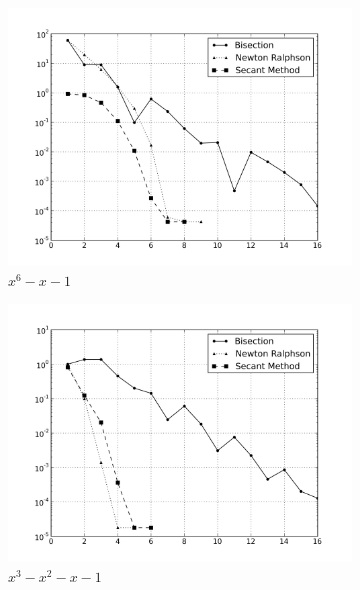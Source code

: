 \documentclass[12,a4paper]{article}
\begin{document}
    \begin{figure}[h!]
        \centering
        \begin{subfigure}[t]{0.49\textwidth}
            \includegraphics[width=\textwidth]{plots/root1.png}
            \caption{$x^6-x-1$}
            \label{fig:root1}
        \end{subfigure}
        \begin{subfigure}[t]{0.49\textwidth}
            \includegraphics[width=\textwidth]{plots/root2.png}
            \caption{$x^3-x^2-x-1$}
            \label{fig:root2}
        \end{subfigure}
        \begin{subfigure}[t]{0.49\textwidth}

\end{subfigure}
\end{figure}
\end{document}
